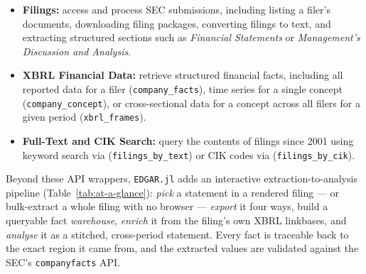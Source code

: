 \documentclass[11pt,a4paper]{report}
\begin{document}
\begin{itemize}[nosep]
  \item \textbf{Filings:} access and process SEC submissions, including listing a filer’s documents, downloading filing packages, converting filings to text, and extracting structured sections such as \emph{Financial Statements} or \emph{Management's Discussion and Analysis}.

  \item \textbf{XBRL Financial Data:} retrieve structured financial facts, including all reported data for a filer (\texttt{company\_facts}), time series for a single concept (\texttt{company\_concept}), or cross-sectional data for a concept across all filers for a given period (\texttt{xbrl\_frames}).

  \item \textbf{Full-Text and CIK Search:} query the contents of filings since 2001 using keyword search via (\texttt{filings\_by\_text}) or CIK codes via (\texttt{filings\_by\_cik}).
\end{itemize}

\medskip
\noindent Beyond these API wrappers, \texttt{EDGAR.jl} adds an interactive
extraction-to-analysis pipeline (Table~\ref{tab:at-a-glance}): \emph{pick} a statement in a
rendered filing --- or bulk-extract a whole filing with no browser --- \emph{export} it four ways,
build a queryable fact \emph{warehouse}, \emph{enrich} it from the filing's own XBRL linkbases,
and \emph{analyse} it as a stitched, cross-period statement. Every fact is traceable back to the
exact region it came from, and the extracted values are validated against the SEC's
\texttt{companyfacts} API.

\begin{center}
\end{center}
\end{document}

